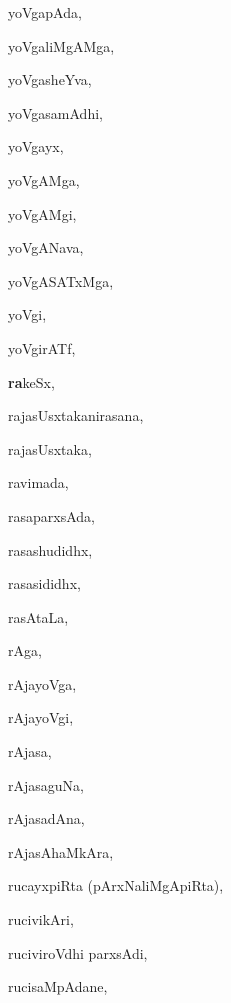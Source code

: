 \begin{multicols}{3}
{\noindent
{yoVgapAda}, \pageref{yoVgapAda}

\noindent
{yoVgaliMgAMga}, \pageref{yoVgaliMgAMga}

\noindent
{yoVgasheYva}, \pageref{yoVgasheYva}

\noindent
{yoVgasamAdhi}, \pageref{yoVgasamAdhi}

\noindent
{yoVgayx}, \pageref{yoVgayx}

\noindent
{yoVgAMga}, \pageref{yoVgAMga}

\noindent
{yoVgAMgi}, \pageref{yoVgAMgi}

\noindent
{yoVgANava}, \pageref{yoVgANava}

\noindent
{yoVgASATxMga}, \pageref{yoVgASATxMga}

\noindent
{yoVgi}, \pageref{yoVgi}

\noindent
{yoVgirATf}, \pageref{yoVgirATf}

\noindent
{{\large\textbf{ra}}keSx}, \pageref{rakeSx}

\noindent
{rajasUsxtakanirasana}, \pageref{rajasUsxtakanirasana}

\noindent
{rajasUsxtaka}, \pageref{rajasUsxtaka}

\noindent
{ravimada}, \pageref{ravimada}

\noindent
{rasaparxsAda}, \pageref{rasaparxsAda}

\noindent
{rasashudidhx}, \pageref{rasashudidhx}

\noindent
{rasasididhx}, \pageref{rasasididhx}

\noindent
{rasAtaLa}, \pageref{rasAtaLa}

\noindent
{rAga}, \pageref{rAga}

\noindent
{rAjayoVga}, \pageref{rAjayoVga}

\noindent
{rAjayoVgi}, \pageref{rAjayoVgi}

\noindent
{rAjasa}, \pageref{rAjasa}

\noindent
{rAjasaguNa}, \pageref{rAjasaguNa}

\noindent
{rAjasadAna}, \pageref{rAjasadAna}

\noindent
{rAjasAhaMkAra}, \pageref{rAjasAhaMkAra}

\noindent
{rucayxpiRta (pArxNaliMgApiRta)}, \pageref{rucayxpiRta (pArxNaliMgApiRta)}

\noindent
{rucivikAri}, \pageref{rucivikAri}

\noindent
{ruciviroVdhi parxsAdi}, \pageref{ruciviroVdhiparxsAdi}

\noindent
{rucisaMpAdane}, \pageref{rucisaMpAdane}

}
\end{multicols}
